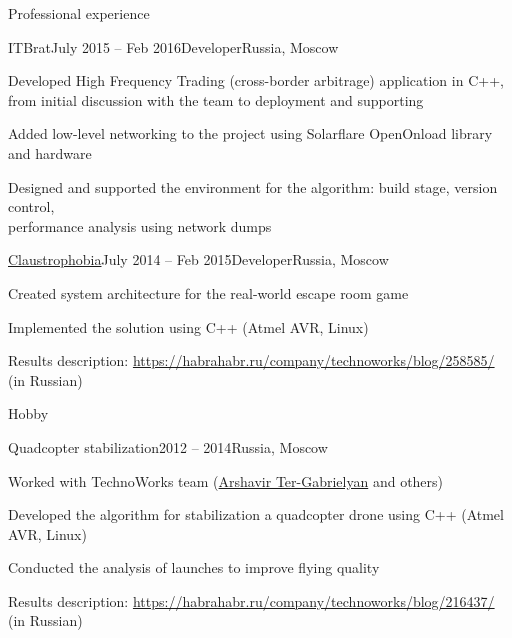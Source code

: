\documentclass{resume} %
\begin{document}
\begin{rSection}{Professional experience}
\begin{rSubsection}{ITBrat}{July 2015 -- Feb 2016}{Developer}{Russia, Moscow}
	\item Developed High Frequency Trading (cross-border arbitrage) application in C++, from initial discussion with the team to deployment and supporting
	\item Added low-level networking to the project using Solarflare OpenOnload library and hardware
	\item Designed and supported the environment for the algorithm: build stage, version control,\\ performance analysis using network dumps
\end{rSubsection}
	
\begin{rSubsection}{\href{http://phobia.ru}{Claustrophobia}}{July 2014 -- Feb 2015}{Developer}{Russia, Moscow}
	\item Created system architecture for the real-world escape room game
	\item Implemented the solution using C++ (Atmel AVR, Linux)
	\item Results description: \url{https://habrahabr.ru/company/technoworks/blog/258585/} (in Russian)
\end{rSubsection}
	
	
\end{rSection}
\newpage

\begin{rSection}{Hobby}
\begin{rSubsection}{Quadcopter stabilization}{2012 -- 2014}{}{Russia, Moscow}
\item Worked with TechnoWorks team (\href{http://www.pm.inf.ethz.ch/people/person-detail.html?persid=220074}{Arshavir Ter-Gabrielyan} and others)
\item Developed the algorithm for stabilization a quadcopter drone using C++ (Atmel AVR, Linux)
\item Conducted the analysis of launches to improve flying quality
\item Results description: \url{https://habrahabr.ru/company/technoworks/blog/216437/} (in Russian)
\end{rSubsection}

\end{rSection}

\end{document}
